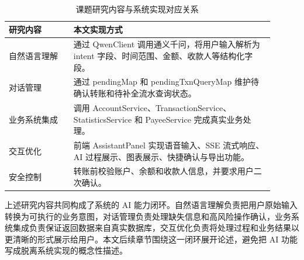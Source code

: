 \documentclass[bachelor, print]{xduthesis}
\begin{document}
\begin{table}[H]
    \centering
    \caption{课题研究内容与系统实现对应关系}
    \label{tab:research-content}
    \begin{tabular}{|p{0.22\linewidth}|p{0.68\linewidth}|}
        \hline
        研究内容 & 本文实现方式 \\
        \hline
        自然语言理解 & 通过 QwenClient 调用通义千问，将用户输入解析为 intent 字段、时间范围、金额、收款人等结构化字段。 \\
        \hline
        对话管理 & 通过 pendingMap 和 pendingTxnQueryMap 维护待确认转账和待补全流水查询状态。 \\
        \hline
        业务系统集成 & 调用 AccountService、TransactionService、StatisticsService 和 PayeeService 完成真实业务处理。 \\
        \hline
        交互优化 & 前端 AssistantPanel 实现语音输入、SSE 流式响应、AI 过程展示、图表展示、快捷确认与导出功能。 \\
        \hline
        安全控制 & 转账前校验账户、余额和收款人信息，并要求用户二次确认。 \\
        \hline
    \end{tabular}
\end{table}

上述研究内容共同构成了系统的 AI 能力闭环。自然语言理解负责把用户原始输入转换为可执行的业务意图，对话管理负责处理缺失信息和高风险操作确认，业务系统集成负责保证返回数据来自真实数据库，交互优化负责将处理过程和业务结果以更清晰的形式展示给用户。本文后续章节围绕这一闭环展开论述，避免把 AI 功能写成脱离系统实现的概念性描述。
\end{document}
